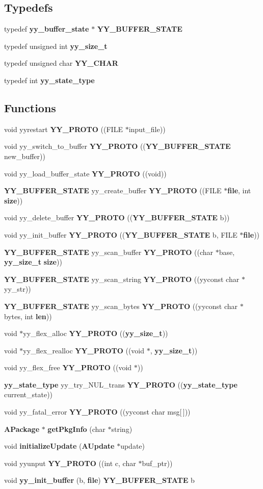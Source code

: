 \subsection*{Typedefs}
\begin{CompactItemize}
\item 
typedef {\bf yy\_\-buffer\_\-state} $\ast$ {\bf YY\_\-BUFFER\_\-STATE}
\item 
typedef unsigned int {\bf yy\_\-size\_\-t}
\item 
typedef unsigned char {\bf YY\_\-CHAR}
\item 
typedef int {\bf yy\_\-state\_\-type}
\end{CompactItemize}
\subsection*{Functions}
\begin{CompactItemize}
\item 
void yyrestart {\bf YY\_\-PROTO} ((FILE $\ast$input\_\-file))
\item 
void yy\_\-switch\_\-to\_\-buffer {\bf YY\_\-PROTO} (({\bf YY\_\-BUFFER\_\-STATE} new\_\-buffer))
\item 
void yy\_\-load\_\-buffer\_\-state {\bf YY\_\-PROTO} ((void))
\item 
{\bf YY\_\-BUFFER\_\-STATE} yy\_\-create\_\-buffer {\bf YY\_\-PROTO} ((FILE $\ast${\bf file}, int {\bf size}))
\item 
void yy\_\-delete\_\-buffer {\bf YY\_\-PROTO} (({\bf YY\_\-BUFFER\_\-STATE} b))
\item 
void yy\_\-init\_\-buffer {\bf YY\_\-PROTO} (({\bf YY\_\-BUFFER\_\-STATE} b, FILE $\ast${\bf file}))
\item 
{\bf YY\_\-BUFFER\_\-STATE} yy\_\-scan\_\-buffer {\bf YY\_\-PROTO} ((char $\ast$base, {\bf yy\_\-size\_\-t} {\bf size}))
\item 
{\bf YY\_\-BUFFER\_\-STATE} yy\_\-scan\_\-string {\bf YY\_\-PROTO} ((yyconst char $\ast$yy\_\-str))
\item 
{\bf YY\_\-BUFFER\_\-STATE} yy\_\-scan\_\-bytes {\bf YY\_\-PROTO} ((yyconst char $\ast$bytes, int {\bf len}))
\item 
void $\ast$yy\_\-flex\_\-alloc {\bf YY\_\-PROTO} (({\bf yy\_\-size\_\-t}))
\item 
void $\ast$yy\_\-flex\_\-realloc {\bf YY\_\-PROTO} ((void $\ast$, {\bf yy\_\-size\_\-t}))
\item 
void yy\_\-flex\_\-free {\bf YY\_\-PROTO} ((void $\ast$))
\item 
{\bf yy\_\-state\_\-type} yy\_\-try\_\-NUL\_\-trans {\bf YY\_\-PROTO} (({\bf yy\_\-state\_\-type} current\_\-state))
\item 
void yy\_\-fatal\_\-error {\bf YY\_\-PROTO} ((yyconst char msg[$\,$]))
\item 
{\bf APackage} $\ast$ {\bf get\-Pkg\-Info} (char $\ast$string)
\item 
void {\bf initialize\-Update} ({\bf AUpdate} $\ast$update)
\item 
void yyunput {\bf YY\_\-PROTO} ((int c, char $\ast$buf\_\-ptr))
\item 
void {\bf yy\_\-init\_\-buffer} (b, {\bf file}) {\bf YY\_\-BUFFER\_\-STATE} b
\end{CompactItemize}
